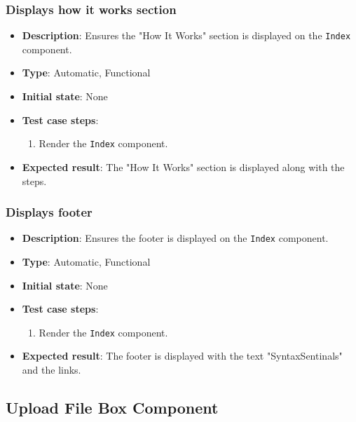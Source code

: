 \documentclass[12pt, titlepage]{article}
\begin{document}
\subsubsection{Displays how it works section}
\begin{itemize}
    \item \textbf{Description}: Ensures the "How It Works" section is displayed on the \texttt{Index} component.
    \item \textbf{Type}: Automatic, Functional
    \item \textbf{Initial state}: None
    \item \textbf{Test case steps}:
    \begin{enumerate}
        \item Render the \texttt{Index} component.
    \end{enumerate}
    \item \textbf{Expected result}: The "How It Works" section is displayed along with the steps.
\end{itemize}

\subsubsection{Displays footer}
\begin{itemize}
    \item \textbf{Description}: Ensures the footer is displayed on the \texttt{Index} component.
    \item \textbf{Type}: Automatic, Functional
    \item \textbf{Initial state}: None
    \item \textbf{Test case steps}:
    \begin{enumerate}
        \item Render the \texttt{Index} component.
    \end{enumerate}
    \item \textbf{Expected result}: The footer is displayed with the text "SyntaxSentinals" and the links.

\end{itemize}

\subsection{Upload File Box Component}
\end{document}
